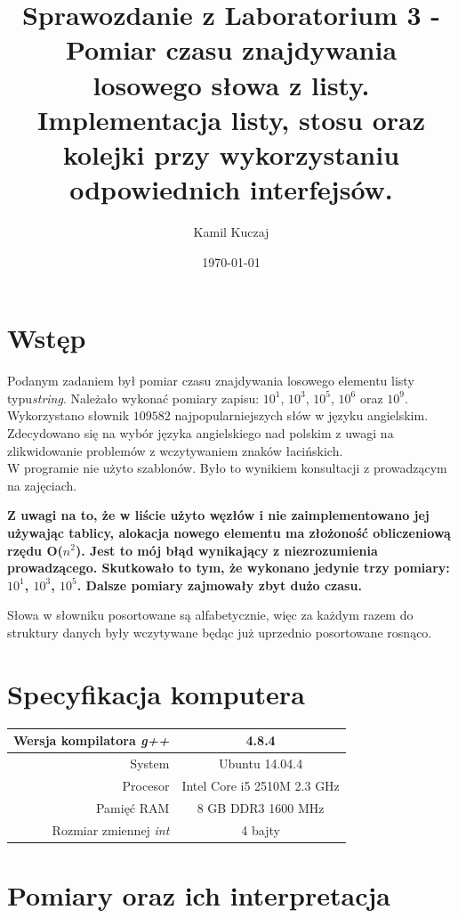 \documentclass[11pt,a4paper]{article}
\author{Kamil Kuczaj}
\title{Sprawozdanie z Laboratorium 3 - Pomiar czasu znajdywania losowego słowa z listy.\\Implementacja listy, stosu oraz kolejki przy wykorzystaniu odpowiednich interfejsów.}
\date{\today}
\begin{document}
\maketitle

\section{Wstęp}
Podanym zadaniem był pomiar czasu znajdywania losowego elementu listy typu\textit{string}. Należało wykonać pomiary zapisu: $10^1$, $10^3$, $10^5$, $10^6$ oraz $10^9$. Wykorzystano słownik $109582$ najpopularniejszych słów w języku angielskim. Zdecydowano się na wybór języka angielskiego nad polskim z uwagi na zlikwidowanie problemów z wczytywaniem znaków łacińskich.\\
W programie nie użyto szablonów. Było to wynikiem konsultacji z prowadzącym na zajęciach.

\textbf{Z uwagi na to, że w liście użyto węzłów i nie zaimplementowano jej używając tablicy, alokacja nowego elementu ma złożoność obliczeniową rzędu O($n^2$). Jest to mój błąd wynikający z niezrozumienia prowadzącego. Skutkowało to tym, że wykonano jedynie trzy pomiary: $10^1$, $10^3$, $10^5$. Dalsze pomiary zajmowały zbyt dużo czasu.}

Słowa w słowniku posortowane są alfabetycznie, więc za każdym razem do struktury danych były wczytywane będąc już uprzednio posortowane rosnąco.

\section{Specyfikacja komputera}

\begin{center}
	\begin{tabular}{| r | c |}
	\hline
	Wersja kompilatora \textit{g++} & 4.8.4 \\ \hline
	System & Ubuntu 14.04.4 \\ \hline
	Procesor	 & Intel Core i5 2510M 2.3 GHz \\ \hline
	Pamięć RAM & 8 GB DDR3 1600 MHz \\ \hline
	Rozmiar zmiennej \textit{int} & 4 bajty \\ \hline
	\end{tabular}
\end{center}

\section{Pomiary oraz ich interpretacja}
\bigskip
\end{document}
